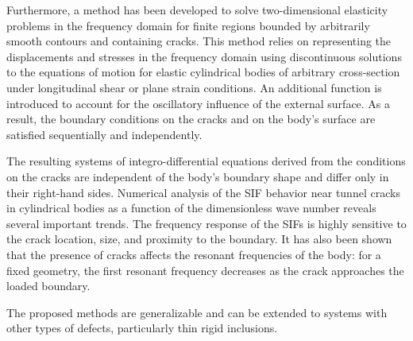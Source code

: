 	Furthermore, a method has been developed to solve two-dimensional elasticity problems in the frequency domain for finite regions bounded by arbitrarily smooth contours and containing cracks. This method relies on representing the displacements and stresses in the frequency domain using discontinuous solutions to the equations of motion for elastic cylindrical bodies of arbitrary cross-section under longitudinal shear or plane strain conditions. An additional function is introduced to account for the oscillatory influence of the external surface. As a result, the boundary conditions on the cracks and on the body's surface are satisfied sequentially and independently.
	
	The resulting systems of integro-differential equations derived from the conditions on the cracks are independent of the body's boundary shape and differ only in their right-hand sides. Numerical analysis of the SIF behavior near tunnel cracks in cylindrical bodies as a function of the dimensionless wave number reveals several important trends. The frequency response of the SIFs is highly sensitive to the crack location, size, and proximity to the boundary. It has also been shown that the presence of cracks affects the resonant frequencies of the body: for a fixed geometry, the first resonant frequency decreases as the crack approaches the loaded boundary.
	
	The proposed methods are generalizable and can be extended to systems with other types of defects, particularly thin rigid inclusions.
	
	


	
	
	
